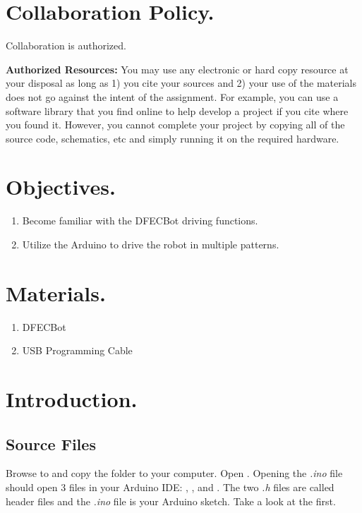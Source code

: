 \documentclass{handout}
\begin{document}
	\maketitle
	
	\section{Collaboration Policy.}
	Collaboration is authorized.
	
	\textbf{Authorized Resources:} You may use any electronic or hard copy resource at your disposal as long as 1) you cite your sources and 2) your use of the materials does not go against the intent of the assignment. For example, you can use a software library that you find online to help develop a project if you cite where you found it. However, you cannot complete your project by copying all of the source code, schematics, etc and simply running it on the required hardware.
	
	\section{Objectives.} 
	\begin{enumerate}
		\item Become familiar with the DFECBot driving functions.
		\item Utilize the Arduino to drive the robot in multiple patterns.
	\end{enumerate}
	
	\section{Materials.}
	\begin{enumerate}
		\item DFECBot
		\item USB Programming Cable
	\end{enumerate}
	
	\newpage
	\clearpage
	\pagebreak
	
	\section{Introduction.}
	
	\subsection{Source Files}
	Browse to  and copy the  folder to your computer. Open . Opening the \textit{.ino} file should open 3 files in your Arduino IDE: , , and . The two \textit{.h} files are called header files and the \textit{.ino} file is your Arduino sketch. Take a look at the  first.
	
\end{document}

